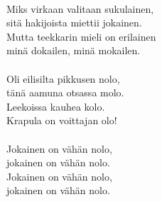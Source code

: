 \hspace{10mm} \\
            Miks virkaan valitaan sukulainen, \\
            sitä hakijoista miettii jokainen. \\
            Mutta teekkarin mieli on erilainen \\
            minä dokailen, minä mokailen. \\
\hspace{10mm} \\
            Oli eilisilta pikkusen nolo, \\
            tänä aamuna otsassa molo. \\
            Leekoissa kauhea kolo. \\
            Krapula on voittajan olo! \\
\hspace{10mm} \\
            Jokainen on vähän nolo, \\
            jokainen on vähän nolo. \\
            Jokainen on vähän nolo, \\
            jokainen on vähän nolo. \\
